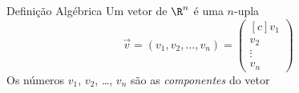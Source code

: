 \documentclass[fleqn,aspectratio=169,12pt]{beamer}
\begin{document}
\begin{frame}{Definição Algébrica}
  Um vetor de $\R^n$ é uma $n$-upla
  \[
    \vec{v}
    = ( v_1, v_2, \ldots, v_n )
    = \begin{pmatrix}[c]
        v_1 \\
        v_2 \\
        \vdots \\
        v_n
    \end{pmatrix}
  \]
  \pause
  Os números $v_1$, $v_2$, \dots, $v_n$ são as \emph{componentes} do vetor
\end{frame}





%
%

\end{document}

